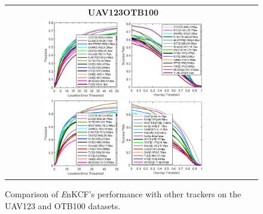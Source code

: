 \documentclass[10pt,twocolumn,letterpaper]{article}
\begin{document}
\begin{figure}[h]
\centering
\begin{tabular}{ccc}
\tiny\quad\textbf{UAV123}\hspace{.37\linewidth}\textbf{OTB100}\\
\includegraphics[width=3.30cm]{./figures/pr_uav123.eps}
\includegraphics[width=3.55cm]{./figures/sr_uav123.eps}
\includegraphics[width=3.30cm]{./figures/pr_otb100.eps}
\includegraphics[width=3.55cm]{./figures/sr_otb100.eps}\\
\end{tabular}
\caption{Comparison of {\it E}nKCF's performance with other trackers on the UAV123 and OTB100 datasets.}
\label{fig:UAV123_DATASET}
\end{figure}
\end{document}
